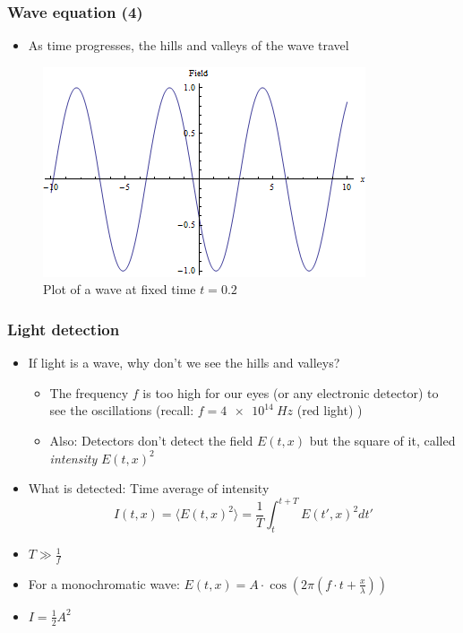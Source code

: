 \begin{frame}
    \frametitle{Wave equation (4)}

    \begin{itemize}
        \item As time progresses, the hills and valleys of the wave travel
    \end{itemize}

    \begin{figure}
        \includegraphics[height=0.65\textheight]{figures/Wave_t02.png}
        \caption{Plot of a wave at fixed time $t=0.2$}
    \end{figure}

\end{frame}

\begin{frame}
    \frametitle{Light detection}

    \begin{itemize}
        \item If light is a wave, why don't we see the hills and valleys?
              \begin{itemize}
                  \setlength\itemsep{0.1cm}
                  \item The frequency $f$ is too high for our eyes (or any electronic detector) to see the oscillations (recall: $f=\SI{4e14}{Hz}$ (red light) )
                  \item Also: Detectors don't detect the field $E(t,x)$ but the square of it, called \emph{intensity} $E(t,x)^2$
              \end{itemize}
        \item What is detected: Time average of intensity
              \begin{equation} I(t,x) = \langle E(t,x)^2 \rangle = \frac{1}{T} \int_t^{t+T}{  E(t',x)^2 } dt'\end{equation}
        \item $T \gg \frac{1}{f}$
        \item For a monochromatic wave: $E(t,x) = A \cdot \cos\left( 2 \pi \left(f \cdot t + \frac{x}{\lambda} \right) \right)$
        \item $I = \frac{1}{2} A^2$
    \end{itemize}

\end{frame}

